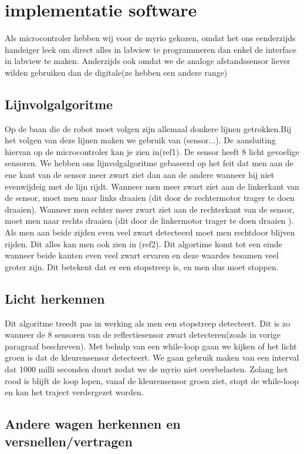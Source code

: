 \documentclass[12pt]{article}
\begin{document}
	


\section*{implementatie software}
Als microcontroler hebben wij voor de myrio gekozen, omdat het ons eenderzijds handeiger leek om direct alles in labview te programmeren dan enkel de interface in labview te maken. Anderzijds ook omdat we de analoge afstandssensor liever wilden gebruiken dan de digitale(ze hebben een andere range)

\subsection{Lijnvolgalgoritme}
Op de baan die de robot moet volgen zijn allemaal donkere lijnen getrokken.Bij het volgen van deze lijnen maken we gebruik van (sensor...).
De aansluiting hiervan op de microcontroler kan je zien in(ref1). De sensor heeft 8 licht gevoelige sensoren. We hebben ons lijnvolgalgoritme gebaseerd op het feit dat men aan de ene kant van de sensor meer zwart ziet dan aan de andere wanneer hij niet evenwijdeig met de lijn rijdt. Wanneer men meer zwart ziet aan de linkerkant van de sensor, moet men naar links draaien (dit door de rechtermotor trager te doen draaien). Wanneer men echter meer zwart ziet aan de rechterkant van de sensor, moet men naar rechts draaien (dit door de linkermotor trager te doen draaien ). Als men aan beide zijden even veel zwart detecteerd moet men rechtdoor blijven rijden. Dit alles kan men ook zien in (ref2). Dit algortime komt tot een einde wanneer beide kanten even veel zwart ervaren en deze waardes tesamen veel groter zijn. Dit betekent dat er een stopstreep is, en men dus moet stoppen. 

\subsection{Licht herkennen}
Dit algoritme treedt pas in werking als men een stopstreep detecteert. Dit is zo wanneer de 8 sensoren van de reflectiesensor zwart detecteren(zoals in vorige paragraaf beschreven). Met behulp van een while-loop gaan we kijken of het licht groen is dat de kleurensensor detecteert. We gaan gebruik maken van een interval dat 1000 milli seconden duurt zodat we de myrio niet overbelasten. Zolang het rood is blijft de loop lopen, vanaf de kleurensensor groen ziet, stopt de while-loop en kan het traject verdergezet worden.

\subsection{Andere wagen herkennen en versnellen/vertragen}
\end{document}

